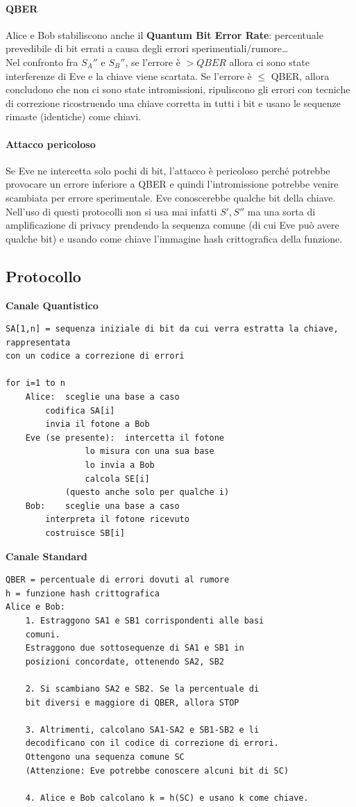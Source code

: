 \documentclass[10pt]{book}
\begin{document}
\paragraph{QBER} Alice e Bob stabiliscono anche il \textbf{Quantum Bit Error Rate}: percentuale prevedibile di bit errati a causa degli errori sperimentiali/rumore\ldots\\
Nel confronto fra $S_A''$ e $S_B''$, se l'errore è $> QBER$ allora ci sono state interferenze di Eve e la chiave viene scartata. Se l'errore è $\leq$ QBER, allora concludono che non ci sono state intromissioni, ripuliscono gli errori con tecniche di correzione ricostruendo una chiave corretta in tutti i bit e usano le sequenze rimaste (identiche) come chiavi.
\paragraph{Attacco pericoloso} Se Eve ne intercetta solo pochi di bit, l'attacco è pericoloso perché potrebbe provocare un errore inferiore a QBER e quindi l'intromissione potrebbe venire scambiata per errore sperimentale. Eve conoscerebbe qualche bit della chiave.\\
Nell'uso di questi protocolli non si usa mai infatti $S', S''$ ma una sorta di amplificazione di privacy prendendo la sequenza comune (di cui Eve può avere qualche bit) e usando come chiave l'immagine hash crittografica della funzione.
\subsection{Protocollo}
\textbf{Canale Quantistico}\begin{lstlisting}
SA[1,n] = sequenza iniziale di bit da cui verra estratta la chiave, rappresentata
con un codice a correzione di errori

for i=1 to n
	Alice:	sceglie una base a caso
		codifica SA[i]
		invia il fotone a Bob
	Eve (se presente):	intercetta il fotone
				lo misura con una sua base
				lo invia a Bob
				calcola SE[i]
			(questo anche solo per qualche i)
	Bob:	sceglie una base a caso
		interpreta il fotone ricevuto
		costruisce SB[i]
\end{lstlisting}
\textbf{Canale Standard} \begin{lstlisting}
QBER = percentuale di errori dovuti al rumore
h = funzione hash crittografica
Alice e Bob:
	1. Estraggono SA1 e SB1 corrispondenti alle basi
	comuni.
	Estraggono due sottosequenze di SA1 e SB1 in
	posizioni concordate, ottenendo SA2, SB2
	
	2. Si scambiano SA2 e SB2. Se la percentuale di
	bit diversi e maggiore di QBER, allora STOP
	
	3. Altrimenti, calcolano SA1-SA2 e SB1-SB2 e li
	decodificano con il codice di correzione di errori.
	Ottengono una sequenza comune SC
	(Attenzione: Eve potrebbe conoscere alcuni bit di SC)
	
	4. Alice e Bob calcolano k = h(SC) e usano k come chiave.
\end{lstlisting}
\end{document}
